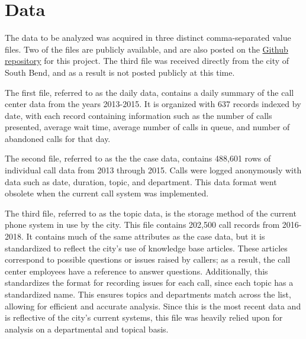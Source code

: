 \documentclass[11pt,twocolumn]{article}
\begin{document}
\section{Data}
The data to be analyzed was acquired in three distinct comma-separated value files.  Two of the files are publicly available, and are also posted on the \href{https://github.com/jdbul33/verbose-chainsaw}{Github repository} for this project.  The third file was received directly from the city of South Bend, and as a result is not posted publicly at this time.
\par
The first file, referred to as the daily data, contains a daily summary of the call center data from the years 2013-2015.  It is organized with 637 records indexed by date, with each record containing information such as the number of calls presented, average wait time, average number of calls in queue, and number of abandoned calls for that day.
\par
The second file, referred to as the the case data, contains 488,601 rows of individual call data from 2013 through 2015.  Calls were logged anonymously with data such as date, duration, topic, and department.  This data format went obsolete when the current call system was implemented.
\par
The third file, referred to as the topic data, is the storage method of the current phone system in use by the city.  This file contains 202,500 call records from 2016-2018.  It contains much of the same attributes as the case data, but it is standardized to reflect the city's use of knowledge base articles.  These articles correspond to possible questions or issues raised by callers; as a result, the call center employees have a reference to answer questions.  Additionally, this standardizes the format for recording issues for each call, since each topic has a standardized name.  This ensures topics and departments match across the list, allowing for efficient and accurate analysis.  Since this is the most recent data and is reflective of the city's current systems, this file was heavily relied upon for analysis on a departmental and topical basis.
\end{document}
